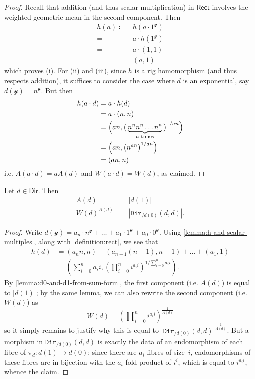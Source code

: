 \documentclass[11pt,fleqn]{article}
\newcommand{\yon}{\mathcal{y}}
\newcommand{\cat}[1]{\mathtt{#1}}
\newcommand{\rig}[1]{\mathsf{#1}}
\newcommand{\Dir}{\rig{Dir}}
\newcommand{\cDir}{\cat{Dir}}
\newcommand{\Rect}{\rig{Rect}}
\begin{document}
\begin{proof}
  Recall that addition (and thus scalar multiplication) in $\Rect$ involves the weighted geometric mean in the second component.
  Then
  \[
    \begin{aligned}
      h(a)
      \coloneqq& h(a\cdot1^\yon)
    \\=& a\cdot h(1^\yon)
    \\=& a\cdot(1,1)
    \\=& (a,1)
    \end{aligned}
  \]
  which proves (i).
  For (ii) and (iii), since $h$ is a rig homomorphism (and thus respects addition), it suffices to consider the case where $d$ is an exponential, say $d(\yon)=n^\yon$.
  But then
  \[
    \begin{aligned}
      h(a\cdot d)
      &= a\cdot h(d)
    \\&= a\cdot(n,n)
    \\&= \Big(
        an,
        \big(\underbrace{n^n n^n\ldots n^n}_{\mbox{\scriptsize$a$ times}}\big)^{1/an}
      \Big)
    \\&= \Big(
        an,
        \big(n^{an}\big)^{1/an}
      \Big)
    \\&= (an,n)
    \end{aligned}
  \]
  i.e. $A(a\cdot d)=aA(d)$ and $W(a\cdot d)=W(d)$, as claimed.
\end{proof}

\begin{corollary}
\label{corollary:area-and-width}
  Let $d\in\Dir$.
  Then
  \[
    \begin{aligned}
      A(d) &= |d(1)|
    \\W(d)^{A(d)} &= \left\vert\cDir_{/d(0)}(d,d)\right\vert.
    \end{aligned}
  \]
\end{corollary}

\begin{proof}
  Write $d(\yon)=a_n\cdot n^\yon+\ldots+a_1\cdot1^\yon+a_0\cdot0^\yon$.
  Using \cref{lemma:h-and-scalar-multiples}, along with \cref{definition:rect}, we see that
  \[
    \begin{aligned}
      h(d)
      &= (a_n n,n) + (a_{n-1}(n-1),n-1) + \ldots + (a_1,1)
    \\&= \left(
        \sum\nolimits_{i=0}^n a_i i,
        \left(\prod\nolimits_{i=0}^n i^{a_i i}\right)^{1/\sum_{i=0}^n a_i i}
      \right).
    \end{aligned}
  \]
  By \cref{lemma:d0-and-d1-from-sum-form}, the first component (i.e. $A(d)$) is equal to $|d(1)|$;
  by the same lemma, we can also rewrite the second component (i.e. $W(d)$) as
  \[
    W(d)
    = \left(\prod\nolimits_{i=0}^n i^{a_i i}\right)^{\frac{1}{A(d)}}
  \]
  so it simply remains to justify why this is equal to $\left\vert\cDir_{/d(0)}(d,d)\right\vert^{\frac{1}{A(d)}}$.
  But a morphism in $\cDir_{/d(0)}(d,d)$ is exactly the data of an endomorphism of each fibre of $\pi_d\colon d(1)\to d(0)$;
  since there are $a_i$ fibres of size~$i$, endomorphisms of these fibres are in bijection with the $a_i$-fold product of $i^i$, which is equal to $i^{a_i i}$, whence the claim.
\end{proof}
\end{document}

